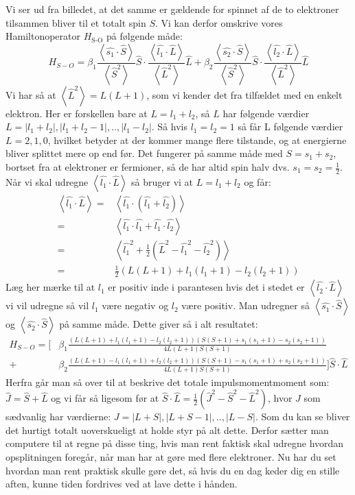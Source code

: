 \documentclass[../../Atom-ogMolekylefysik.tex]{subfiles}
\begin{document}
Vi ser ud fra billedet, at det samme er gældende for spinnet af de to elektroner tilsammen bliver til et totalt spin $S$. Vi kan derfor omskrive vores Hamiltonoperator $H_\text{S-O}$ på følgende måde:
\begin{equation}
H_{S-O}=\beta_1\frac{\left<\hat{s_1}\cdot\hat{S}\right>}{\left<\hat{S}^2\right>}\hat{S}\cdot\frac{\left<\hat{l_1}\cdot\hat{L}\right>}{\left<\hat{L}^2\right>}\hat{L}+\beta_2\frac{\left<\hat{s_2}\cdot\hat{S}\right>}{\left<\hat{S}^2\right>}\hat{S}\cdot\frac{\left<\hat{l_2}\cdot\hat{L}\right>}{\left<\hat{L}^2\right>}\hat{L}
\end{equation}
Vi har så at $\left<\hat{L}^2\right>=L(L+1)$, som vi kender det fra tilfældet med en enkelt elektron. Her er forskellen bare at $L=l_1+l_2$, så $L$ har følgende værdier $L=|l_1+l_2|, |l_1+l_2-1|,..,|l_1-l_2|$. Så hvis $l_1=l_2=1$ så får L følgende værdier $L=2,1,0$, hvilket betyder at der kommer mange flere tilstande, og at energierne bliver splittet mere op end før. Det fungerer på samme måde med $S=s_1+s_2$, bortset fra at elektroner er fermioner, så de har altid spin halv dvs. $s_1=s_2=\frac{1}{2}$. 
Når vi skal udregne $\left<\hat{l_1}\cdot\hat{L}\right>$ så bruger vi at $L=l_1+l_2$ og får:
\begin{align}
    \left<\hat{l_1}\cdot\hat{L}\right>
    \nonumber=&\left<\hat{l_1}\cdot(\hat{l_1}+\hat{l_2})\right>\\
    \nonumber=&\left<\hat{l_1}\cdot\hat{l_1}+\hat{l_1}\cdot\hat{l_2}\right>\\
    =&\left<\hat{l_1}^2+\frac{1}{2}\left(\hat{L}^2-\hat{l_1}^2-\hat{l_2}^2 \right)\right>\\
    \nonumber=&\frac{1}{2}\left(L(L+1)+l_1(l_1+1)-l_2(l_2+1)\right)
\end{align}
Læg her mærke til at $l_1$ er positiv inde i parantesen hvis det i stedet er $\left<\hat{l_2}\cdot\hat{L}\right>$ vi vil udregne så vil $l_1$ være negativ og $l_2$ være positiv. Man udregner så $\left<\hat{s_1}\cdot\hat{S}\right>$ og $\left<\hat{s_2}\cdot\hat{S}\right>$ på samme måde. Dette giver så i alt resultatet:
\begin{align}
    H_{S-O}=\Bigg[&\beta_1\frac{(L(L+1)+l_1(l_1+1)-l_2(l_2+1))(S(S+1)+s_1(s_1+1)-s_2(s_2+1))}{4L(L+1)S(S+1)}\\
    +&\beta_2\frac{(L(L+1)-l_1(l_1+1)+l_2(l_2+1))(S(S+1)-s_1(s_1+1)+s_2(s_2+1))}{4L(L+1)S(S+1)}\Bigg]\hat{S}\cdot\hat{L}\nonumber
\end{align}
Herfra går man så over til at beskrive det totale impulsmomentmoment som: $\hat{J}=\hat{S}+\hat{L}$ og vi får så ligesom før at $\hat{S}\cdot\hat{L}=\frac{1}{2}\left(\hat{J}^2-\hat{S}^2-\hat{L}^2\right)$, hvor $J$ som sædvanlig har værdierne: $J=|L+S|,|L+S-1|,..,|L-S|$.
Som du kan se bliver det hurtigt totalt uoverskueligt at holde styr på alt dette. Derfor sætter man computere til at regne på disse ting, hvis man rent faktisk skal udregne hvordan opsplitningen foregår, når man har at gøre med flere elektroner. Nu har du set hvordan man rent praktisk skulle gøre det, så hvis du en dag keder dig en stille aften, kunne tiden fordrives ved at lave dette i hånden.
\end{document}
